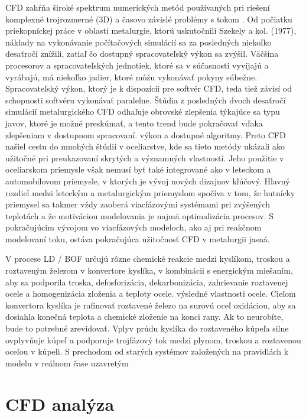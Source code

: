 \documentclass[]{tukediphc}
\begin{document}
CFD zahŕňa široké spektrum numerických metód používaných pri riešení komplexné trojrozmerné (3D) a časovo závislé problémy s tokom \citep{RAPP20173}. Od počiatku priekopníckej práce v oblasti metalurgie, ktorú uskutočnili Szekely a kol. (1977), náklady na vykonávanie počítačových simulácií sa za posledných niekoľko desaťročí znížili, zatiaľ čo dostupný spracovateľský výkon sa zvýšil. Väčšina procesorov a spracovateľských jednotiek, ktoré sa v súčasnosti vyvíjajú a vyrábajú, má niekoľko jadier, ktoré môžu vykonávať pokyny súbežne. Spracovateľský výkon, ktorý je k dispozícii pre softvér CFD, teda tiež závisí od schopnosti softvéru vykonávať paralelne. Štúdia z posledných dvoch desaťročí \citep{Ersson2018} simulácií metalurgického CFD odhaľuje obrovské zlepšenia týkajúce sa typu javov, ktoré je možné preskúmať, a tento trend bude pokračovať vďaka zlepšeniam v dostupnom spracovaní. výkon a dostupné algoritmy. Preto CFD našiel cestu do mnohých štúdií v oceliarstve, kde sa tieto metódy ukázali ako užitočné pri preukazovaní skrytých a významných vlastností. Jeho použitie v oceliarskom priemysle však nemusí byť také integrované ako v leteckom a automobilovom priemysle, v ktorých je vývoj nových dizajnov kľúčový. Hlavný rozdiel medzi leteckým a metalurgickým priemyslom spočíva v tom, že hutnícky priemysel sa takmer vždy zaoberá viacfázovými systémami pri zvýšených teplotách a že motiváciou modelovania je najmä optimalizácia procesov. S pokračujúcim vývojom vo viacfázových modeloch, ako aj pri reakčnom modelovaní toku, ostáva pokračujúca užitočnosť CFD v metalurgii jasná.

V procese LD / BOF určujú rôzne chemické reakcie medzi kyslíkom, troskou a roztaveným železom v konvertore kyslíka, v kombinácii s energickým miešaním, aby sa podporila troska, defosforizácia, dekarbonizácia, zahrievanie roztavenej ocele a homogenizácia zloženia a teploty ocele. výsledné vlastnosti ocele. Cieľom konvertora kyslíka je rafinovať roztavené železo na surovú oceľ oxidáciou, aby sa dosiahla konečná teplota a chemické zloženie na konci rany. Ak to neurobíte, bude to potrebné zrevidovať. Vplyv prúdu kyslíka do roztaveného kúpeľa silne ovplyvňuje kúpeľ a podporuje trojfázový tok medzi plynom, troskou a roztavenou oceľou v kúpeli. S prechodom od starých systémov založených na pravidlách k modelu v reálnom čase uzavretým

\section{CFD analýza}
\end{document}
